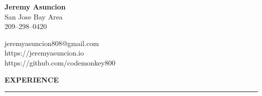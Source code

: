 \documentclass[10pt, oneside]{letter}
\newcommand{\linespaceshit} {
  \vspace{0.05in}
  \hrule
  \vspace{0.05in}
}
\begin{document}
  \begin{minipage}[t]{11cm}
    \flushleft
    \textbf{Jeremy Asuncion} \\
    San Jose Bay Area \\
    209--298--0420 \\

  \end{minipage}
  \begin{minipage}[t]{7cm}
    \flushright
    jeremyasuncion808@gmail.com \\
    https://jeremyasuncion.io \\
    https://github.com/codemonkey800
  \end{minipage}

  \vspace{0.1in}

  \textbf{EXPERIENCE}
  \linespaceshit
\end{document}

